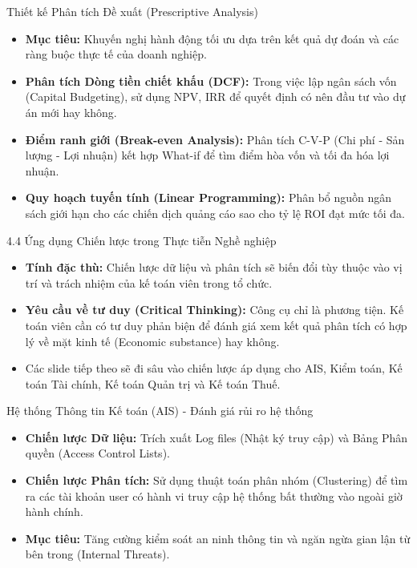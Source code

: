 \documentclass[aspectratio=169,12pt]{beamer}
\begin{document}
\begin{frame}{Thiết kế Phân tích Đề xuất (Prescriptive Analysis)}
\begin{itemize}
    \item \textbf{Mục tiêu:} Khuyến nghị hành động tối ưu dựa trên kết quả dự đoán và các ràng buộc thực tế của doanh nghiệp.
    \item \textbf{Phân tích Dòng tiền chiết khấu (DCF):} Trong việc lập ngân sách vốn (Capital Budgeting), sử dụng NPV, IRR để quyết định có nên đầu tư vào dự án mới hay không.
    \item \textbf{Điểm ranh giới (Break-even Analysis):} Phân tích C-V-P (Chi phí - Sản lượng - Lợi nhuận) kết hợp What-if để tìm điểm hòa vốn và tối đa hóa lợi nhuận.
    \item \textbf{Quy hoạch tuyến tính (Linear Programming):} Phân bổ nguồn ngân sách giới hạn cho các chiến dịch quảng cáo sao cho tỷ lệ ROI đạt mức tối đa.
\end{itemize}
\end{frame}

\begin{frame}{4.4 Ứng dụng Chiến lược trong Thực tiễn Nghề nghiệp}
\begin{itemize}
    \item \textbf{Tính đặc thù:} Chiến lược dữ liệu và phân tích sẽ biến đổi tùy thuộc vào vị trí và trách nhiệm của kế toán viên trong tổ chức.
    \item \textbf{Yêu cầu về tư duy (Critical Thinking):} Công cụ chỉ là phương tiện. Kế toán viên cần có tư duy phản biện để đánh giá xem kết quả phân tích có hợp lý về mặt kinh tế (Economic substance) hay không.
    \item Các slide tiếp theo sẽ đi sâu vào chiến lược áp dụng cho AIS, Kiểm toán, Kế toán Tài chính, Kế toán Quản trị và Kế toán Thuế.
\end{itemize}
\end{frame}

\begin{frame}{Hệ thống Thông tin Kế toán (AIS) - Đánh giá rủi ro hệ thống}
\begin{itemize}
    \item \textbf{Chiến lược Dữ liệu:} Trích xuất Log files (Nhật ký truy cập) và Bảng Phân quyền (Access Control Lists).
    \item \textbf{Chiến lược Phân tích:} Sử dụng thuật toán phân nhóm (Clustering) để tìm ra các tài khoản user có hành vi truy cập hệ thống bất thường vào ngoài giờ hành chính.
    \item \textbf{Mục tiêu:} Tăng cường kiểm soát an ninh thông tin và ngăn ngừa gian lận từ bên trong (Internal Threats).
\end{itemize}
\end{frame}
\end{document}
